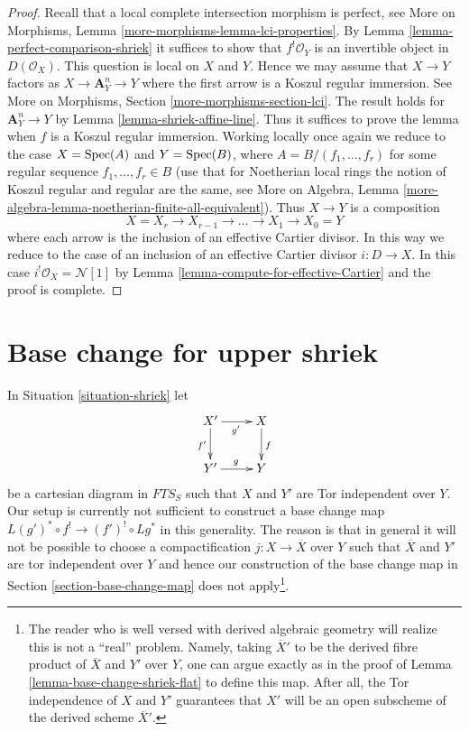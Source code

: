 \begin{proof}
Recall that a local complete intersection morphism is perfect, see
More on Morphisms, Lemma \ref{more-morphisms-lemma-lci-properties}.
By Lemma \ref{lemma-perfect-comparison-shriek} it suffices to show
that $f^!\mathcal{O}_Y$ is an invertible object in $D(\mathcal{O}_X)$.
This question is local on $X$ and $Y$. Hence we may assume that $X \to Y$
factors as $X \to \mathbf{A}^n_Y \to Y$ where the first arrow is a
Koszul regular immersion. See More on Morphisms, Section
\ref{more-morphisms-section-lci}.
The result holds for $\mathbf{A}^n_Y \to Y$
by Lemma \ref{lemma-shriek-affine-line}. Thus it suffices to prove
the lemma when $f$ is a Koszul regular immersion.
Working locally once again we reduce to the case
$X = \mathop{\mathrm{Spec}}(A)$ and $Y = \mathop{\mathrm{Spec}}(B)$, where $A = B/(f_1, \ldots, f_r)$
for some regular sequence $f_1, \ldots, f_r \in B$
(use that for Noetherian local rings the notion of Koszul
regular and regular are the same, see
More on Algebra, Lemma
\ref{more-algebra-lemma-noetherian-finite-all-equivalent}).
Thus $X \to Y$ is a composition
$$
X = X_r \to X_{r - 1} \to \ldots \to X_1 \to X_0 = Y
$$
where each arrow is the inclusion of an effective Cartier divisor.
In this way we reduce to the case of an inclusion of an effective
Cartier divisor $i : D \to X$. In this case
$i^!\mathcal{O}_X = \mathcal{N}[1]$ by
Lemma \ref{lemma-compute-for-effective-Cartier} and the proof is complete.
\end{proof}







\section{Base change for upper shriek}
\label{section-base-change-shriek}

\noindent
In Situation \ref{situation-shriek} let
$$
\xymatrix{
X' \ar[r]_{g'} \ar[d]_{f'} & X \ar[d]^f \\
Y' \ar[r]^g & Y
}
$$
be a cartesian diagram in $\textit{FTS}_S$ such that
$X$ and $Y'$ are Tor independent over $Y$. Our setup is currently
not sufficient to construct a base change map
$L(g')^* \circ f^! \to (f')^! \circ Lg^*$ in this generality.
The reason is that in general it will not be possible to choose
a compactification $j : X \to \overline{X}$ over $Y$ such that
$\overline{X}$ and $Y'$ are tor independent over $Y$ and hence
our construction of the base change map in
Section \ref{section-base-change-map} does not apply\footnote{
The reader who is well versed with derived algebraic geometry
will realize this is not a ``real'' problem. Namely, taking
$\overline{X}'$ to be the derived fibre product of
$\overline{X}$ and $Y'$ over $Y$, one can argue exactly as in
the proof of Lemma \ref{lemma-base-change-shriek-flat}
to define this map. After all, the Tor independence
of $X$ and $Y'$ guarantees that $X'$ will be an open subscheme
of the derived scheme $\overline{X}'$.}.

